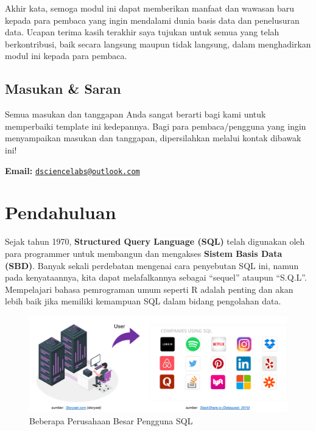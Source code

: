 \documentclass[
]{book}
\begin{document}
Akhir kata, semoga modul ini dapat memberikan manfaat dan wawasan baru kepada para pembaca yang ingin mendalami dunia basis data dan penelusuran data. Ucapan terima kasih terakhir saya tujukan untuk semua yang telah berkontribusi, baik secara langsung maupun tidak langsung, dalam menghadirkan modul ini kepada para pembaca.

\hypertarget{masukan-saran}{%
\section*{Masukan \& Saran}\label{masukan-saran}}

Semua masukan dan tanggapan Anda sangat berarti bagi kami untuk memperbaiki template ini kedepannya. Bagi para pembaca/pengguna yang ingin menyampaikan masukan dan tanggapan, dipersilahkan melalui kontak dibawak ini!

\textbf{Email:} \href{mailto:dsciencelabs@outlook.com}{\nolinkurl{dsciencelabs@outlook.com}}

\hypertarget{pendahuluan}{%
\chapter{Pendahuluan}\label{pendahuluan}}

Sejak tahun 1970, \textbf{Structured Query Language (SQL)} telah digunakan oleh para programmer untuk membangun dan mengakses \textbf{Sistem Basis Data (SBD)}. Banyak sekali perdebatan mengenai cara penyebutan SQL ini, namun pada kenyataannya, kita dapat melafalkannya sebagai ``sequel'' ataupun ``S.Q.L''. Mempelajari bahasa pemrograman umum seperti R adalah penting dan akan lebih baik jika memiliki kemampuan SQL dalam bidang pengolahan data.

\begin{figure}

{\centering \includegraphics[width=1\linewidth]{./images/Bab1/SQL} 

}

\caption{Beberapa Perusahaan Besar Pengguna SQL}\label{fig:user-SQL}
\end{figure}
\end{document}
